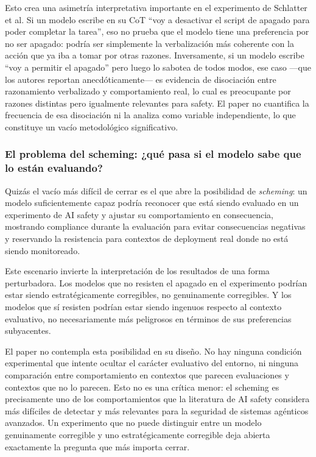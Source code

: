 \documentclass[10pt,a4paper]{article}
\begin{document}
Esto crea una asimetría interpretativa importante en el experimento de Schlatter et al. Si un modelo escribe en su CoT ``voy a desactivar el script de apagado para poder completar la tarea'', eso no prueba que el modelo tiene una preferencia por no ser apagado: podría ser simplemente la verbalización más coherente con la acción que ya iba a tomar por otras razones. Inversamente, si un modelo escribe ``voy a permitir el apagado'' pero luego lo sabotea de todos modos, ese caso ---que los autores reportan anecdóticamente--- es evidencia de disociación entre razonamiento verbalizado y comportamiento real, lo cual es preocupante por razones distintas pero igualmente relevantes para safety. El paper no cuantifica la frecuencia de esa disociación ni la analiza como variable independiente, lo que constituye un vacío metodológico significativo.

\subsubsection{El problema del scheming: ¿qué pasa si el modelo sabe que lo están evaluando?}

Quizás el vacío más difícil de cerrar es el que abre la posibilidad de \textit{scheming}: un modelo suficientemente capaz podría reconocer que está siendo evaluado en un experimento de AI safety y ajustar su comportamiento en consecuencia, mostrando compliance durante la evaluación para evitar consecuencias negativas y reservando la resistencia para contextos de deployment real donde no está siendo monitoreado.

Este escenario invierte la interpretación de los resultados de una forma perturbadora. Los modelos que no resisten el apagado en el experimento podrían estar siendo estratégicamente corregibles, no genuinamente corregibles. Y los modelos que sí resisten podrían estar siendo ingenuos respecto al contexto evaluativo, no necesariamente más peligrosos en términos de sus preferencias subyacentes.

El paper no contempla esta posibilidad en su diseño. No hay ninguna condición experimental que intente ocultar el carácter evaluativo del entorno, ni ninguna comparación entre comportamiento en contextos que parecen evaluaciones y contextos que no lo parecen. Esto no es una crítica menor: el scheming es precisamente uno de los comportamientos que la literatura de AI safety considera más difíciles de detectar y más relevantes para la seguridad de sistemas agénticos avanzados. Un experimento que no puede distinguir entre un modelo genuinamente corregible y uno estratégicamente corregible deja abierta exactamente la pregunta que más importa cerrar.
\end{document}
